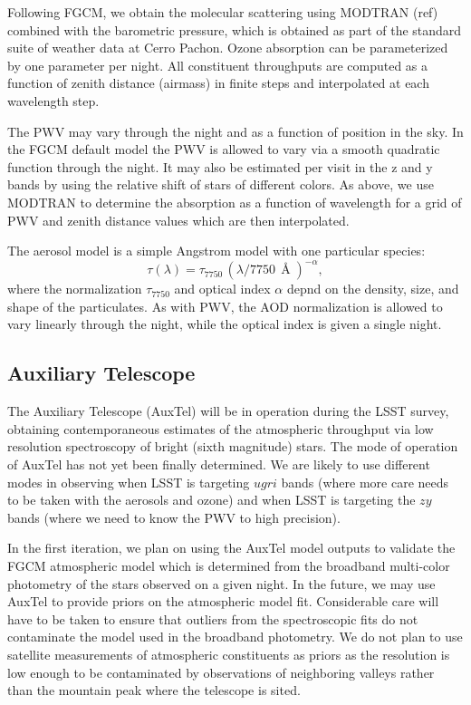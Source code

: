 \documentclass[SE,authoryear,lsstdraft,toc]{lsstdoc}
\begin{document}
Following FGCM, we obtain the molecular scattering using MODTRAN (ref) combined
with the barometric pressure, which is obtained as part of the standard suite
of weather data at Cerro Pachon.  Ozone absorption can be parameterized by one
parameter per night.  All constituent throughputs are computed as a function of
zenith distance (airmass) in finite steps and interpolated at each wavelength step.

The PWV may vary through the night and as a function of position in the sky.
In the FGCM default model the PWV is allowed to vary via a smooth quadratic
function through the night.  It may also be estimated per visit in the z and y
bands by using the relative shift of stars of different colors.  As above, we
use MODTRAN to determine the absorption as a function of wavelength for a grid
of PWV and zenith distance values which are then interpolated.

The aerosol model is a simple Angstrom model with one particular species:
%
\begin{equation}
\tau(\lambda) = \tau_{7750}\,(\lambda/7750\,\Angstrom)^{-\alpha},
\end{equation}
%
where the normalization $\tau_{7750}$ and optical index $\alpha$ depnd on the
density, size, and shape of the particulates.  As with PWV, the AOD
normalization is allowed to vary linearly through the night, while the optical
index is given a single night.

\subsection{Auxiliary Telescope}

The Auxiliary Telescope (AuxTel) will be in operation during the LSST survey,
obtaining contemporaneous estimates of the atmospheric throughput via low
resolution spectroscopy of bright (sixth magnitude) stars.  The mode of
operation of AuxTel has not yet been finally determined.  We are likely to use
different modes in observing when LSST is targeting $ugri$ bands (where more
care needs to be taken with the aerosols and ozone) and when LSST is targeting
the $zy$ bands (where we need to know the PWV to high precision).

In the first iteration, we plan on using the AuxTel model outputs to validate
the FGCM atmospheric model which is determined from the broadband multi-color
photometry of the stars observed on a given night.  In the future, we may use
AuxTel to provide priors on the atmospheric model fit.  Considerable care will
have to be taken to ensure that outliers from the spectroscopic fits do not
contaminate the model used in the broadband photometry.  We do not plan to use
satellite measurements of atmospheric constituents as priors as the resolution
is low enough to be contaminated by observations of neighboring valleys rather
than the mountain peak where the telescope is sited.
\end{document}
